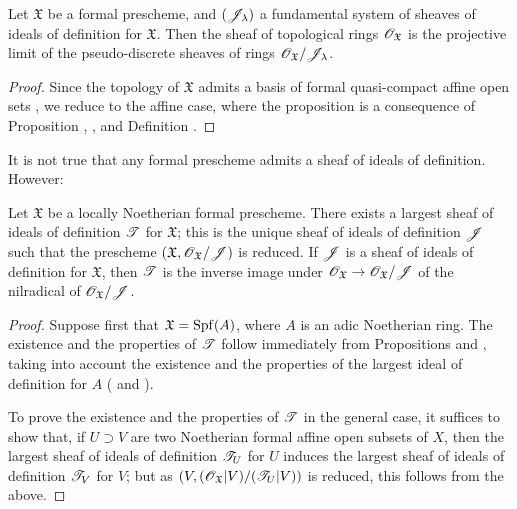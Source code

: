 \begin{proposition}[10.5.3]
\label{1.10.5.3}
Let $\mathfrak{X}$ be a formal prescheme, and $(\mathscr{J}_\lambda)$ a fundamental system of sheaves of ideals of definition for $\mathfrak{X}$.
Then the sheaf of topological rings $\mathscr{O}_\mathfrak{X}$ is the projective limit of the pseudo-discrete sheaves of rings  $\mathscr{O}_\mathfrak{X}/\mathscr{J}_\lambda$.
\end{proposition}

\begin{proof}
\label{proof-1.10.5.3}
Since the topology of $\mathfrak{X}$ admits a basis of formal quasi-compact affine open sets , we reduce to the affine case, where the proposition is a consequence of Proposition , , and Definition .
\end{proof}

It is not true that any formal prescheme admits a sheaf of ideals of definition.
However:
\begin{proposition}[10.5.4]
\label{1.10.5.4}
Let $\mathfrak{X}$ be a locally Noetherian formal prescheme.
There exists a largest sheaf of ideals of definition $\mathscr{T}$ for $\mathfrak{X}$; this is the unique sheaf of ideals of definition $\mathscr{J}$ such that the prescheme $(\mathfrak{X},\mathscr{O}_\mathfrak{X}/\mathscr{J})$ is reduced.
If $\mathscr{J}$ is a sheaf of ideals of definition for $\mathfrak{X}$, then $\mathscr{T}$ is the inverse image under $\sh{O}_\mathfrak{X}\to\sh{O}_\mathfrak{X}/\sh{J}$ of the nilradical of $\mathscr{O}_\mathfrak{X}/\mathscr{J}$.
\end{proposition}

\begin{proof}
\label{proof-1.10.5.4}
Suppose first that $\mathfrak{X}=\operatorname{Spf}(A)$, where $A$ is an adic Noetherian ring.
The existence and the properties of $\mathscr{T}$ follow immediately from Propositions  and , taking into account the existence and the properties of the largest ideal of definition for $A$ ( and ).

To prove the existence and the properties of $\mathscr{T}$ in the general case, it suffices to show that, if $U\supset V$ are two Noetherian formal affine open subsets of $X$, then the largest sheaf of ideals of definition $\mathscr{T}_U$ for $U$ induces the largest sheaf of ideals of definition $\mathscr{T}_V$ for $V$; but as $(V,(\mathscr{O}_\mathfrak{X}|V)/(\mathscr{T}_U|V))$ is reduced, this follows from the above.
\end{proof}

